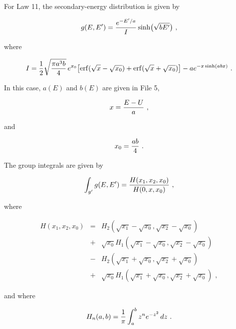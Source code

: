 For Law 11, the secondary-energy distribution is given by

  \begin{equation}
    g(E,E')={{e^{-E'/a}}\over I}\sinh\bigl(\sqrt{bE'}\bigr)\,\,,
  \end{equation}

\noindent
where

  \begin{equation}
    I={1\over 2} \sqrt{{{\pi a^3 b}\over 4}}
    \,e^{x_0} \bigl[ {\rm erf}(\sqrt{x}-\sqrt{x_0})
    +{\rm erf}(\sqrt{x}+\sqrt{x_0}) \bigr]
    -a e^{-x\sinh(abx)}\,\,.
  \end{equation}

\noindent
In this case, $a(E)$ and $b(E)$ are given in File 5,

  \begin{equation}
    x={{E-U}\over a}\,\,,
  \end{equation}
\vspace{0.5 pt}

\noindent
and

  \begin{equation}
    x_0={{ab}\over 4}\,\,.
  \end{equation}
\vspace{0.5 pt}

\noindent
The group integrals are given by

  \begin{equation}
    \int_{g'}g(E,E')={{H(x_1,x_2,x_0)}\over{H(0,x,x_0)}}\,\,,
  \label{Eq99}
  \end{equation}
\vspace{0.5 pt}

\noindent
where

  \begin{eqnarray}
    H(x_1,x_2,x_0)&=&H_2(\sqrt{x_1}-\sqrt{x_0},\sqrt{x_2}-\sqrt{x_0})\nonumber\\
    &+&\sqrt{x_0}H_1(\sqrt{x_1}-\sqrt{x_0},\sqrt{x_2}-\sqrt{x_0})\nonumber\\
    &-&H_2(\sqrt{x_1}+\sqrt{x_0},\sqrt{x_2}+\sqrt{x_0})\nonumber\\
    &+&\sqrt{x_0}H_1(\sqrt{x_1}+\sqrt{x_0},\sqrt{x_2}+\sqrt{x_0})\,\,,
  \end{eqnarray}

\noindent
and where

  \begin{equation}
    H_n(a,b)={1\over\pi}\int_a^b z^n e^{-z^2}\,dz\,\,.
  \end{equation}
\vspace{0.5 pt}

